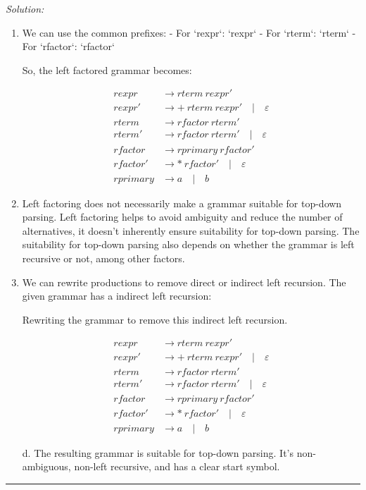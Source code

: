 \documentclass[a4paper, 11pt]{article}
\newenvironment{solution}
    {\textit{Solution:}}
    {}
\begin{document}
\begin{solution}
\begin{enumerate}[a]

\item

We can use the common prefixes:
- For `rexpr`: `rexpr` 
- For `rterm`: `rterm`
- For `rfactor`: `rfactor`

So, the left factored grammar becomes:

\begin{align*}
rexpr &\rightarrow rterm \ rexpr' \\
rexpr' &\rightarrow + \ rterm \ rexpr' \quad | \quad \varepsilon \\
rterm &\rightarrow rfactor \ rterm' \\
rterm' &\rightarrow rfactor \ rterm' \quad | \quad \varepsilon \\
rfactor &\rightarrow rprimary \ rfactor' \\
rfactor' &\rightarrow * \ rfactor' \quad | \quad \varepsilon \\
rprimary &\rightarrow a \quad | \quad b
\end{align*}

\item Left factoring does not necessarily make a grammar suitable for top-down parsing. Left factoring  helps to avoid ambiguity and reduce the number of alternatives, it doesn't inherently ensure suitability for top-down parsing. The suitability for top-down parsing also depends on whether the grammar is left recursive or not, among other factors.

\item We can rewrite productions to remove direct or indirect left recursion. The given grammar has a indirect left recursion:



Rewriting the grammar to remove this indirect left recursion. 

\begin{align*}
rexpr &\rightarrow rterm \ rexpr' \\
rexpr' &\rightarrow + \ rterm \ rexpr' \quad | \quad \varepsilon \\
rterm &\rightarrow rfactor \ rterm' \\
rterm' &\rightarrow rfactor \ rterm' \quad | \quad \varepsilon \\
rfactor &\rightarrow rprimary \ rfactor' \\
rfactor' &\rightarrow * \ rfactor' \quad | \quad \varepsilon \\
rprimary &\rightarrow a \quad | \quad b
\end{align*}


d. The resulting grammar is suitable for top-down parsing. It's non-ambiguous, non-left recursive, and has a clear start symbol.

\end{enumerate}
\end{solution} 
\noindent\rule{7in}{2.8pt}
\end{document}
